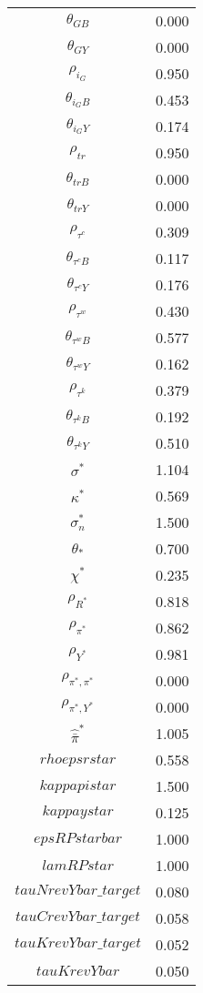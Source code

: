 \begin{center}
\begin{longtable}{cc}
$\theta_{GB}$ 	 & 	 0.000 \\
$\theta_{GY}$ 	 & 	 0.000 \\
$\rho_{i_G}$ 	 & 	 0.950 \\
$\theta_{i_GB}$ 	 & 	 0.453 \\
$\theta_{i_GY}$ 	 & 	 0.174 \\
$\rho_{tr}$ 	 & 	 0.950 \\
$\theta_{trB}$ 	 & 	 0.000 \\
$\theta_{trY}$ 	 & 	 0.000 \\
$\rho_{\tau^c}$ 	 & 	 0.309 \\
$\theta_{\tau^cB}$ 	 & 	 0.117 \\
$\theta_{\tau^cY}$ 	 & 	 0.176 \\
$\rho_{\tau^w}$ 	 & 	 0.430 \\
$\theta_{\tau^wB}$ 	 & 	 0.577 \\
$\theta_{\tau^wY}$ 	 & 	 0.162 \\
$\rho_{\tau^k}$ 	 & 	 0.379 \\
$\theta_{\tau^kB}$ 	 & 	 0.192 \\
$\theta_{\tau^kY}$ 	 & 	 0.510 \\
$\sigma^*$ 	 & 	 1.104 \\
$\kappa^*$ 	 & 	 0.569 \\
$\sigma^*_n$ 	 & 	 1.500 \\
$\theta_*$ 	 & 	 0.700 \\
$\chi^*$ 	 & 	 0.235 \\
${\rho_{R^*}}$ 	 & 	 0.818 \\
${\rho_{\pi^*}}$ 	 & 	 0.862 \\
${\rho_{Y^*}}$ 	 & 	 0.981 \\
${\rho_{\pi^*,\pi^*}}$ 	 & 	 0.000 \\
${\rho_{\pi^*,Y^*}}$ 	 & 	 0.000 \\
$\hat{\bar{\pi}}^*$ 	 & 	 1.005 \\
$rhoepsrstar$ 	 & 	 0.558 \\
$kappapistar$ 	 & 	 1.500 \\
$kappaystar$ 	 & 	 0.125 \\
$epsRPstarbar$ 	 & 	 1.000 \\
$lamRPstar$ 	 & 	 1.000 \\
$tauNrevYbar\_target$ 	 & 	 0.080 \\
$tauCrevYbar\_target$ 	 & 	 0.058 \\
$tauKrevYbar\_target$ 	 & 	 0.052 \\
$tauKrevYbar$ 	 & 	 0.050 \\

\end{longtable}
\end{center}

